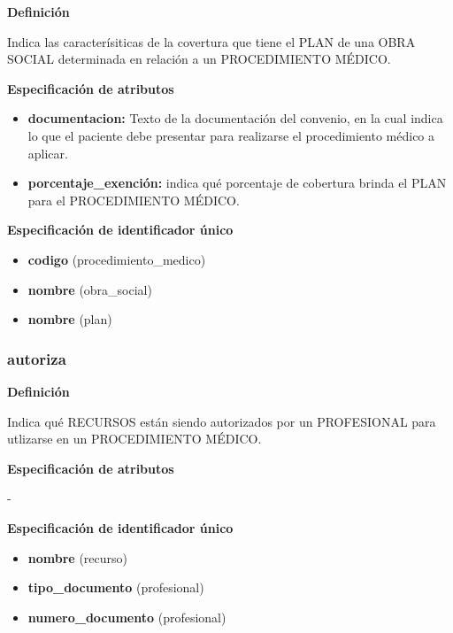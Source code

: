 \documentclass[a4paper,11pt]{article}
\begin{document}
\textbf{Definición}

Indica las caracterísiticas de la covertura que tiene el PLAN de una 
OBRA SOCIAL determinada en relación a un PROCEDIMIENTO MÉDICO.

\textbf{Especificación de atributos}

\begin{itemize}

     \item \textbf{documentacion:} Texto de la documentación del convenio, en la cual 
     indica lo que el paciente debe presentar para realizarse el procedimiento médico 
     a aplicar.

     \item \textbf{porcentaje\_exención:} indica qué porcentaje de cobertura brinda
     el PLAN para el PROCEDIMIENTO MÉDICO.

\end{itemize}

\textbf{Especificación de identificador único}

\begin{itemize}

     \item \textbf{codigo} (procedimiento\_medico)

     \item \textbf{nombre} (obra\_social)

     \item \textbf{nombre} (plan)

\end{itemize}

\subsubsection{\textbf{autoriza}}

\textbf{Definición}

Indica qué RECURSOS están siendo autorizados por un PROFESIONAL para utlizarse en 
un PROCEDIMIENTO MÉDICO.

\textbf{Especificación de atributos}

-

\textbf{Especificación de identificador único}

\begin{itemize}

     \item \textbf{nombre} (recurso)

     \item \textbf{tipo\_documento} (profesional)

     \item \textbf{numero\_documento} (profesional)

\end{itemize}
\end{document}
